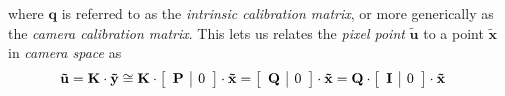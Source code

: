 where $\mathbf{q}$ is referred to as the \textit{intrinsic calibration matrix}, or more generically as the \textit{camera calibration matrix}. This lets us relates the \textit{pixel point} $\mathbf{\tilde{u}}$ to a point $\mathbf{\tilde{x}}$ in \textit{camera space} as
\begin{equation*}
\begin{split}
\mathbf{\tilde{u}}&=\mathbf{K}\cdot\mathbf{\tilde{y}}
\cong\mathbf{K}\cdot\left[\begin{array}{c|c}\mathbf{P} & \vZero\end{array}\right]\cdot
\mathbf{\tilde{x}}
=\left[\begin{array}{c|c}\mathbf{Q}&\vZero\end{array}\right]\cdot
\mathbf{\tilde{x}}
=\mathbf{Q}\cdot\left[\begin{array}{c|c}\mathbf{I} & \vZero\end{array}\right]\cdot
\mathbf{\tilde{x}}
%

\end{split}
\end{equation*}
